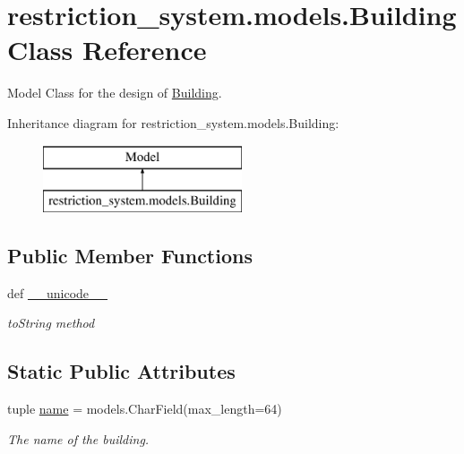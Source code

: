 \hypertarget{classrestriction__system_1_1models_1_1Building}{}\section{restriction\+\_\+system.\+models.\+Building Class Reference}
\label{classrestriction__system_1_1models_1_1Building}


Model Class for the design of \hyperlink{classrestriction__system_1_1models_1_1Building}{Building}.  


Inheritance diagram for restriction\+\_\+system.\+models.\+Building\+:\begin{figure}[H]
\begin{center}
\leavevmode
\includegraphics[height=2.000000cm]{classrestriction__system_1_1models_1_1Building}
\end{center}
\end{figure}
\subsection*{Public Member Functions}
\begin{DoxyCompactItemize}
\item 
def \hyperlink{classrestriction__system_1_1models_1_1Building_ad62b70f9216793fa84fe74bf03ac9962}{\+\_\+\+\_\+unicode\+\_\+\+\_\+}
\begin{DoxyCompactList}\small\item\em to\+String method \end{DoxyCompactList}\end{DoxyCompactItemize}
\subsection*{Static Public Attributes}
\begin{DoxyCompactItemize}
\item 
\hypertarget{classrestriction__system_1_1models_1_1Building_aa7cd335fca37793d27f6c0f3764a8be6}{}tuple \hyperlink{classrestriction__system_1_1models_1_1Building_aa7cd335fca37793d27f6c0f3764a8be6}{name} = models.\+Char\+Field(max\+\_\+length=64)\label{classrestriction__system_1_1models_1_1Building_aa7cd335fca37793d27f6c0f3764a8be6}

\begin{DoxyCompactList}\small\item\em The name of the building. \end{DoxyCompactList}\end{DoxyCompactItemize}


